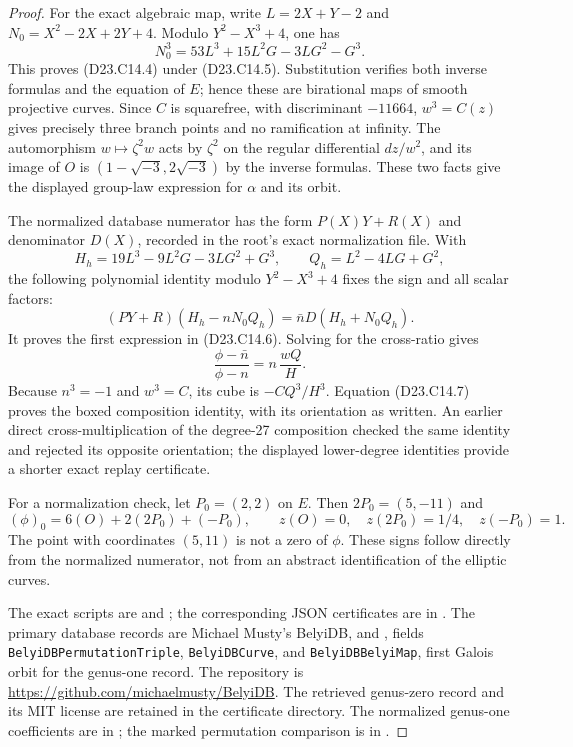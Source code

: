 \begin{proof}
For the exact algebraic map, write
$L=2X+Y-2$ and $N_0=X^2-2X+2Y+4$. Modulo $Y^2-X^3+4$, one has
\[
 N_0^3=53L^3+15L^2G-3LG^2-G^3.
\]
This proves (D23.C14.4) under (D23.C14.5). Substitution verifies both
inverse formulas and the equation of $E$; hence these are
birational maps of smooth projective curves. Since $C$ is squarefree,
with discriminant $-11664$, $w^3=C(z)$ gives precisely three branch
points and no ramification at infinity.
The automorphism $w\mapsto\zeta^2w$ acts by $\zeta^2$ on the regular
differential $dz/w^2$, and its image of $O$ is
$(1-\sqrt{-3},2\sqrt{-3})$ by the inverse formulas. These two facts
give the displayed group-law expression for $\alpha$ and its orbit.

The normalized database numerator has the form $P(X)Y+R(X)$ and
denominator $D(X)$, recorded in the root's exact normalization file.
With
\[
 H_h=19L^3-9L^2G-3LG^2+G^3,\qquad
 Q_h=L^2-4LG+G^2,
\]
the following polynomial identity modulo $Y^2-X^3+4$ fixes the sign
and all scalar factors:
\[
 (PY+R)(H_h-nN_0Q_h)
       =\bar n D(H_h+N_0Q_h).
\]
It proves the first expression in (D23.C14.6). Solving for the
cross-ratio gives
\[
              \frac{\phi-\bar n}{\phi-n}
                       =n\,\frac{wQ}{H}.
\]
Because $n^3=-1$ and $w^3=C$, its cube is $-CQ^3/H^3$.
Equation (D23.C14.7) proves the boxed composition identity, with its
orientation as written. An earlier direct cross-multiplication of
the degree-27 composition checked the same identity and rejected
its opposite orientation; the displayed lower-degree identities
provide a shorter exact replay certificate.

For a normalization check, let $P_0=(2,2)$ on $E$. Then
$2P_0=(5,-11)$ and
\[
 (\phi)_0=6(O)+2(2P_0)+(-P_0),\qquad
 z(O)=0,\quad z(2P_0)=1/4,\quad z(-P_0)=1.
\]
The point with coordinates $(5,11)$ is not a zero of $\phi$.
These signs follow directly from the normalized numerator, not
from an abstract identification of the elliptic curves.

The exact scripts are
 and
;
the corresponding JSON certificates are in
.
The primary database records are Michael Musty's BelyiDB,
 and
,
fields \texttt{BelyiDBPermutationTriple}, \texttt{BelyiDBCurve},
and \texttt{BelyiDBBelyiMap}, first Galois orbit for the genus-one
record. The repository is
\url{https://github.com/michaelmusty/BelyiDB}.
The retrieved genus-zero record and its MIT license are retained
in the certificate directory. The normalized genus-one coefficients
are in ; the marked
permutation comparison is in .
\end{proof}

